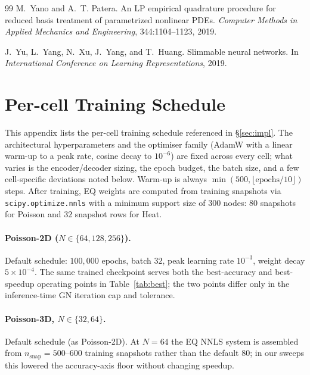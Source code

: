 \documentclass{article}
\begin{document}
\begin{thebibliography}{99}
M.~Yano and A.~T. Patera.
\newblock An LP empirical quadrature procedure for reduced basis
treatment of parametrized nonlinear PDEs.
\newblock \emph{Computer Methods in Applied Mechanics and Engineering},
344:1104--1123, 2019.

J.~Yu, L.~Yang, N.~Xu, J.~Yang, and T.~Huang.
\newblock Slimmable neural networks.
\newblock In \emph{International Conference on Learning Representations},
2019.

\end{thebibliography}

\appendix

\section{Per-cell Training Schedule}
\label{app:training-schedule}

This appendix lists the per-cell training schedule referenced in
\S\ref{sec:impl}. The architectural hyperparameters and the optimiser
family (AdamW \citep{LoshchilovHutter2019AdamW} with a linear warm-up
to a peak rate, cosine decay \citep{LoshchilovHutter2017SGDR} to
$10^{-6}$) are fixed across every cell; what varies is the encoder/decoder
sizing, the epoch budget, the batch size, and a few cell-specific
deviations noted below. Warm-up is always
$\min(500, \lfloor \text{epochs}/10\rfloor)$ steps. After training, EQ
weights are computed from training snapshots via
\texttt{scipy.optimize.nnls} with a minimum support size of $300$ nodes:
$80$ snapshots for Poisson and $32$ snapshot rows for Heat.

\paragraph{Poisson-2D ($N \in \{64, 128, 256\}$).}
Default schedule: $100{,}000$ epochs, batch $32$, peak learning rate
$10^{-3}$, weight decay $5\times10^{-4}$. The same trained checkpoint
serves both the best-accuracy and best-speedup operating points in
Table~\ref{tab:best}; the two points differ only in the inference-time
GN iteration cap and tolerance.

\paragraph{Poisson-3D, $N \in \{32, 64\}$.}
Default schedule (as Poisson-2D). At $N{=}64$ the EQ NNLS system is
assembled from $n_\mathrm{snap} = 500$--$600$ training snapshots
rather than the default $80$; in our sweeps this lowered the
accuracy-axis floor without changing speedup.
\end{document}
